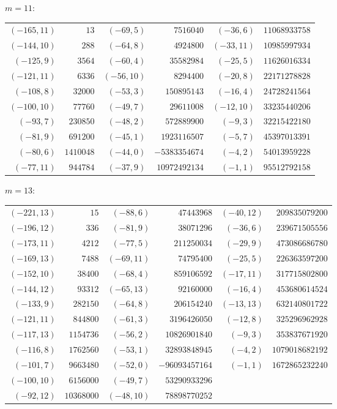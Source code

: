 \documentclass[11pt]{amsart}
\theoremstyle{definition}
\begin{document}
\noindent$m=11$:\nopagebreak\\[2pt]
{\small\begin{tabular}{@{}r@{\ \ }r@{\qquad}r@{\ \ }r@{\qquad}r@{\ \ }r@{}}
$(-165,11)$ & $13$ & $(-69,5)$ & $7516040$ & $(-36,6)$ & $11068933758$ \\
$(-144,10)$ & $288$ & $(-64,8)$ & $4924800$ & $(-33,11)$ & $10985997934$ \\
$(-125,9)$ & $3564$ & $(-60,4)$ & $35582984$ & $(-25,5)$ & $11626016334$ \\
$(-121,11)$ & $6336$ & $(-56,10)$ & $8294400$ & $(-20,8)$ & $22171278828$ \\
$(-108,8)$ & $32000$ & $(-53,3)$ & $150895143$ & $(-16,4)$ & $24728241564$ \\
$(-100,10)$ & $77760$ & $(-49,7)$ & $29611008$ & $(-12,10)$ & $33235440206$ \\
$(-93,7)$ & $230850$ & $(-48,2)$ & $572889900$ & $(-9,3)$ & $32215422180$ \\
$(-81,9)$ & $691200$ & $(-45,1)$ & $1923116507$ & $(-5,7)$ & $45397013391$ \\
$(-80,6)$ & $1410048$ & $(-44,0)$ & $-5383354674$ & $(-4,2)$ & $54013959228$ \\
$(-77,11)$ & $944784$ & $(-37,9)$ & $10972492134$ & $(-1,1)$ & $95512792158$ \\
\end{tabular}}\par\medskip
\noindent$m=13$:\nopagebreak\\[2pt]
{\small\begin{tabular}{@{}r@{\ \ }r@{\qquad}r@{\ \ }r@{\qquad}r@{\ \ }r@{}}
$(-221,13)$ & $15$ & $(-88,6)$ & $47443968$ & $(-40,12)$ & $209835079200$ \\
$(-196,12)$ & $336$ & $(-81,9)$ & $38071296$ & $(-36,6)$ & $239671505556$ \\
$(-173,11)$ & $4212$ & $(-77,5)$ & $211250034$ & $(-29,9)$ & $473086686780$ \\
$(-169,13)$ & $7488$ & $(-69,11)$ & $74795400$ & $(-25,5)$ & $226363597200$ \\
$(-152,10)$ & $38400$ & $(-68,4)$ & $859106592$ & $(-17,11)$ & $317715802800$ \\
$(-144,12)$ & $93312$ & $(-65,13)$ & $92160000$ & $(-16,4)$ & $453680614524$ \\
$(-133,9)$ & $282150$ & $(-64,8)$ & $206154240$ & $(-13,13)$ & $632140801722$ \\
$(-121,11)$ & $844800$ & $(-61,3)$ & $3196426050$ & $(-12,8)$ & $325296962928$ \\
$(-117,13)$ & $1154736$ & $(-56,2)$ & $10826901840$ & $(-9,3)$ & $353837671920$ \\
$(-116,8)$ & $1762560$ & $(-53,1)$ & $32893848945$ & $(-4,2)$ & $1079018682192$ \\
$(-101,7)$ & $9663480$ & $(-52,0)$ & $-96093457164$ & $(-1,1)$ & $1672865232240$ \\
$(-100,10)$ & $6156000$ & $(-49,7)$ & $53290933296$ & & \\
$(-92,12)$ & $10368000$ & $(-48,10)$ & $78898770252$ & & \\
\end{tabular}}\par\medskip
\end{document}
